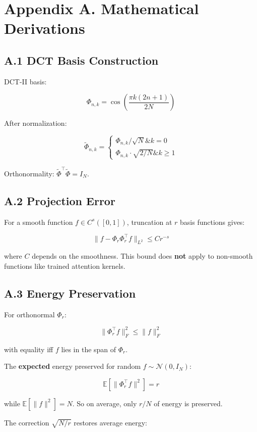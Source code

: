 
\section{Appendix A. Mathematical Derivations}

\subsection{A.1 DCT Basis Construction}

DCT-II basis:

\[
\Phi_{n, k} = \cos\!\left(\frac{\pi k (2n + 1)}{2N}\right)
\]

After normalization:

\[
\tilde{\Phi}_{n, k} = \begin{cases}
\Phi_{n, k} / \sqrt{N} \& k = 0 \\
\Phi_{n, k} \cdot \sqrt{2/N} \& k \geq 1
\end{cases}
\]

Orthonormality: $\tilde{\Phi}^\top \tilde{\Phi} = I_N$.

\subsection{A.2 Projection Error}

For a smooth function $f \in C^s([0, 1])$, truncation at $r$ basis 
functions gives:

\[
\|f - \Phi_r \Phi_r^\top f\|_{L^2} \leq C r^{-s}
\]

where $C$ depends on the smoothness. This bound does \textbf{not} apply to 
non-smooth functions like trained attention kernels.

\subsection{A.3 Energy Preservation}

For orthonormal $\Phi_r$:

\[
\|\Phi_r^\top f\|_F^2 \leq \|f\|_F^2
\]

with equality iff $f$ lies in the span of $\Phi_r$.

The \textbf{expected} energy preserved for random $f \sim \mathcal{N}(0, I_N)$:

\[
\mathbb{E}[\|\Phi_r^\top f\|^2] = r
\]

while $\mathbb{E}[\|f\|^2] = N$. So on average, only $r/N$ of energy 
is preserved.

The correction $\sqrt{N/r}$ restores average energy:

